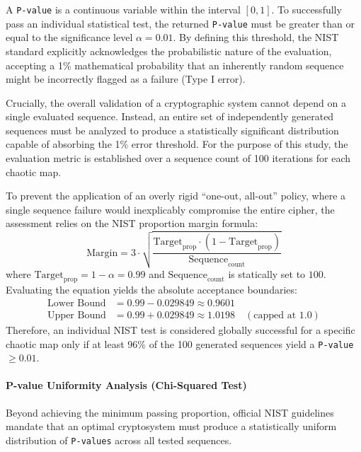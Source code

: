 \documentclass[11pt,a4paper]{report}
\begin{document}
A \texttt{P-value} is a continuous variable within the interval $[0, 1]$. 
To successfully pass an individual statistical test, the returned \texttt{P-value} must be greater than or equal to the significance level $\alpha = 0.01$. 
By defining this threshold, the NIST standard explicitly acknowledges the probabilistic nature of the evaluation, accepting a 1\% mathematical probability that an inherently random sequence might be incorrectly flagged as a failure (Type I error).

Crucially, the overall validation of a cryptographic system cannot depend on a single evaluated sequence. 
Instead, an entire set of independently generated sequences must be analyzed to produce a statistically significant distribution capable of absorbing the 1\% error threshold. 
For the purpose of this study, the evaluation metric is established over a sequence count of 100 iterations for each chaotic map.

To prevent the application of an overly rigid ``one-out, all-out'' policy, where a single sequence failure would inexplicably compromise the entire cipher,
the assessment relies on the NIST proportion margin formula:
\begin{equation}
    \text{Margin} = 3 \cdot \sqrt{\frac{\text{Target}_{\text{prop}} \cdot (1 - \text{Target}_{\text{prop}})}{\text{Sequence}_{\text{count}}}}
\end{equation}
where $\text{Target}_{\text{prop}} = 1 - \alpha = 0.99$ and $\text{Sequence}_{\text{count}}$ is statically set to $100$. Evaluating the equation yields the absolute acceptance boundaries:
\begin{align*}
    \text{Lower Bound} &= 0.99 - 0.029849 \approx 0.9601 \\
    \text{Upper Bound} &= 0.99 + 0.029849 \approx 1.0198 \quad (\text{capped at } 1.0)
\end{align*}
Therefore, an individual NIST test is considered globally successful for a specific chaotic map only if at least 96\% of the 100 generated sequences yield a \texttt{P-value} $\ge 0.01$.

\paragraph{P-value Uniformity Analysis (Chi-Squared Test)}
Beyond achieving the minimum passing proportion, official NIST guidelines mandate that an optimal cryptosystem must produce a statistically uniform distribution of \texttt{P-values} across all tested sequences. 
\end{document}
